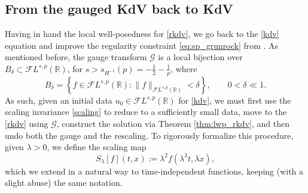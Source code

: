 \documentclass[a4paper,
11pt,  reqno]{amsart}
\newcommand{\5}{\textup{V}}
\newcommand{\FL}{\mathcal{F} L}
\theoremstyle{remark}
\newcommand{\R}{\mathbb{R}}
\newcommand{\Gc}{\mathcal{G}}
\numberwithin{equation}{section}
\numberwithin{theorem}{section}
\begin{document}
\subsection{From the gauged KdV back to KdV}
Having in hand the local well-posedness for \eqref{rkdv}, we go back to the \eqref{kdv} equation and improve the regularity constraint \eqref{eq:sp_grunrock} from \cite{Grunrock_ldv_hier}. As mentioned before, the gauge transform $\Gc$ is a local bijection over $B_\delta\subset \FL^{s,p}(\R)$, for $s>s_{H^{-1}}(p) = -\frac12-\frac1p$, where
$$
B_\delta=\left\{ f \in \FL^{s,p}(\R): \|f\|_{\FL^{s,p}(\R)}<\delta\right\},\qquad 0<\delta\ll 1.
$$
As such, given an initial data $u_0\in \FL^{s,p}(\R)$ for \eqref{kdv}, we must first use the scaling invariance \eqref{scaling} to reduce to a sufficiently small data, move to the \eqref{rkdv} using $\Gc$, construct the solution via Theorem \ref{thm:lwp_rkdv}, and then undo both the gauge and the rescaling.
To rigorously formalize this procedure,  given $\lambda>0$, we define the scaling map
   \begin{equation}
    \label{SR}
    S_\lambda[f](t,x) := \lambda^2 f(\lambda^3 t, \lambda x),
   \end{equation}
which we extend in a natural way to time-independent functions, keeping (with a slight abuse) the same notation.
\end{document}
